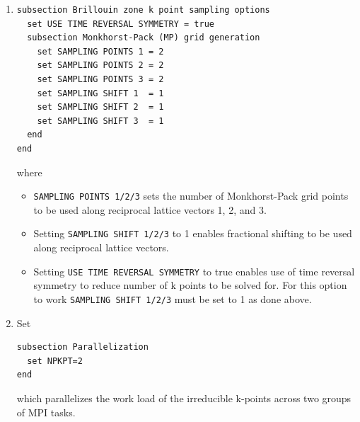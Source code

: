 \begin{enumerate}
\item 
\begin{verbatim}
subsection Brillouin zone k point sampling options
  set USE TIME REVERSAL SYMMETRY = true
  subsection Monkhorst-Pack (MP) grid generation
    set SAMPLING POINTS 1 = 2
    set SAMPLING POINTS 2 = 2
    set SAMPLING POINTS 3 = 2
    set SAMPLING SHIFT 1  = 1
    set SAMPLING SHIFT 2  = 1
    set SAMPLING SHIFT 3  = 1
  end
end
\end{verbatim}
where
\begin{itemize}
\item \verb|SAMPLING POINTS 1/2/3| sets the number of Monkhorst-Pack grid points to be used along reciprocal lattice
vectors 1, 2, and 3.  		
\item Setting \verb|SAMPLING SHIFT 1/2/3| to 1 enables fractional shifting to be used along reciprocal lattice vectors.
\item Setting \verb|USE TIME REVERSAL SYMMETRY| to true enables use of time reversal symmetry to reduce number of k points to be solved for. For this option to work  \verb|SAMPLING SHIFT 1/2/3| must be set to 1 as done above. 
\end{itemize}

\item Set 
\begin{verbatim}	
subsection Parallelization
  set NPKPT=2
end
\end{verbatim}
which parallelizes the work load of the irreducible k-points across two groups of MPI tasks.


\end{enumerate}
